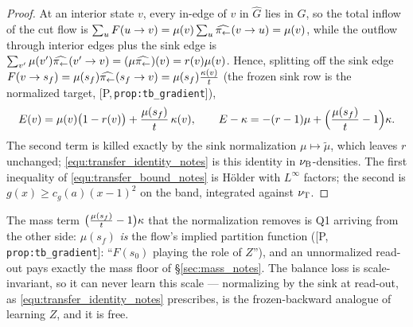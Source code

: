 \documentclass[11pt]{article}
\theoremstyle{definition}
\theoremstyle{remark}
\newcommand{\paperref}[1]{[P,\,\texttt{#1}]}   %
\begin{document}
\begin{proof}
At an interior state $v$, every in-edge of $v$ in $\widehat G$ lies in $G$, so the total
inflow of the cut flow is $\sum_uF(u\rightarrow v)=\mu(v)\sum_u\widehat{\pi_{\leftarrow}}(v\rightarrow u)=\mu(v)$,
while the outflow through interior edges plus the sink edge is
$\sum_{v'}\mu(v')\widehat{\pi_{\leftarrow}}(v'\rightarrow v)=(\mu\widehat{\pi_{\leftarrow}})(v)=r(v)\mu(v)$.
Hence, splitting off the sink edge $F(v\rightarrow s_f)=\mu(s_f)\widehat{\pi_{\leftarrow}}(s_f\rightarrow v)
=\mu(s_f)\frac{\kappa(v)}{t}$ (the frozen sink row is the normalized target,
\paperref{prop:tb\_gradient}),
\begin{equation*}
    E(v)=\mu(v)\bigl(1-r(v)\bigr)+\frac{\mu(s_f)}{t}\,\kappa(v),
    \qquad
    E-\kappa=-(r-1)\mu+\Bigl(\frac{\mu(s_f)}{t}-1\Bigr)\kappa .
\end{equation*}
The second term is killed exactly by the sink normalization $\mu\mapsto\widetilde\mu$,
which leaves $r$ unchanged; \eqref{equ:transfer_identity_notes} is this identity in
$\nu_{\mathrm{B}}$-densities. The first inequality of \eqref{equ:transfer_bound_notes} is H\"older with
$L^\infty$ factors; the second is $g(x)\geq c_g(a)(x-1)^2$ on the band, integrated
against $\nu_{\mathrm{T}}$.
\end{proof}

The mass term $\bigl(\frac{\mu(s_f)}{t}-1\bigr)\kappa$ that the normalization removes is
Q1 arriving from the other side: $\mu(s_f)$ \emph{is} the flow's implied partition
function (\paperref{prop:tb\_gradient}: ``$F(s_0)$ playing the role of $Z$''), and an
unnormalized read-out pays exactly the mass floor of \S\ref{sec:mass_notes}. The balance loss
is scale-invariant, so it can never learn this scale --- normalizing by the sink at
read-out, as \eqref{equ:transfer_identity_notes} prescribes, is the frozen-backward analogue of
learning $Z$, and it is free.
\end{document}
